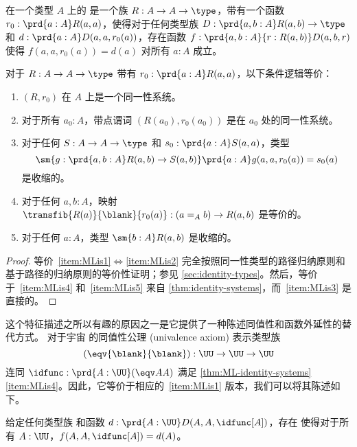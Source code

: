 \begin{defn}
    在一个类型 $A$ 上的
    是一个族 $R:A\to A\to \type$，带有一个函数 $r_0:\prd{a:A} R(a,a)$，使得对于任何类型族 $D:\prd{a,b:A} R(a,b) \to \type$ 和 $d:\prd{a:A} D(a,a,r_0(a))$，存在函数 $f:\prd{a,b:A}{r:R(a,b)} D(a,b,r)$ 使得 $f(a,a,r_0(a))=d(a)$ 对所有 $a:A$ 成立。
\end{defn}

\begin{thm}\label{thm:ML-identity-systems}
对于 $R:A\to A\to\type$ 带有 $r_0:\prd{a:A} R(a,a)$，以下条件逻辑等价：
\begin{enumerate}
    \item $(R,r_0)$ 在 $A$ 上是一个同一性系统。\label{item:MLis1}
    \item 对于所有 $a_0:A$，带点谓词 $(R(a_0),r_0(a_0))$ 是在 $a_0$ 处的同一性系统。\label{item:MLis2}
    \item 对于任何 $S:A\to A\to\type$ 和 $s_0:\prd{a:A} S(a,a)$，类型
    \[ \sm{g:\prd{a,b:A} R(a,b) \to S(a,b)} \prd{a:A} g(a,a,r_0(a)) = s_0(a) \]
    是收缩的。\label{item:MLis3}
    \item 对于任何 $a,b:A$，映射 $\transfib{R(a)}{\blank}{r_0(a)} : (a =_A b) \to R(a,b)$ 是等价的。\label{item:MLis4}
    \item 对于任何 $a:A$，类型 $\sm{b:A} R(a,b)$ 是收缩的。\label{item:MLis5}
\end{enumerate}
\end{thm}
\begin{proof}
    等价~\ref{item:MLis1}$\Leftrightarrow$\ref{item:MLis2} 完全按照同一性类型的路径归纳原则和基于路径的归纳原则的等价性证明；参见 \cref{sec:identity-types}。然后，等价于~\ref{item:MLis4} 和~\ref{item:MLis5} 来自 \cref{thm:identity-systems}，而~\ref{item:MLis3} 是直接的。
\end{proof}

%

这个特征描述之所以有趣的原因之一是它提供了一种陈述同值性和函数外延性的替代方式。
%
对于宇宙 \UU 的同值性公理 (univalence axiom) 表示类型族
\[ (\eqv{\blank}{\blank}) : \UU\to\UU\to\UU \]
连同 $\idfunc : \prd{A:\UU} (\eqv AA)$ 满足 \cref{thm:ML-identity-systems}\ref{item:MLis4}。因此，它等价于相应的~\ref{item:MLis1} 版本，我们可以将其陈述如下。

\begin{cor}\label{thm:equiv-induction}
%
%
给定任何类型族  和函数 $d:\prd{A:\UU} D(A,A,\idfunc[A])$，存在  使得对于所有 $A:\UU$，$f(A,A,\idfunc[A]) = d(A)$。
\end{cor}

